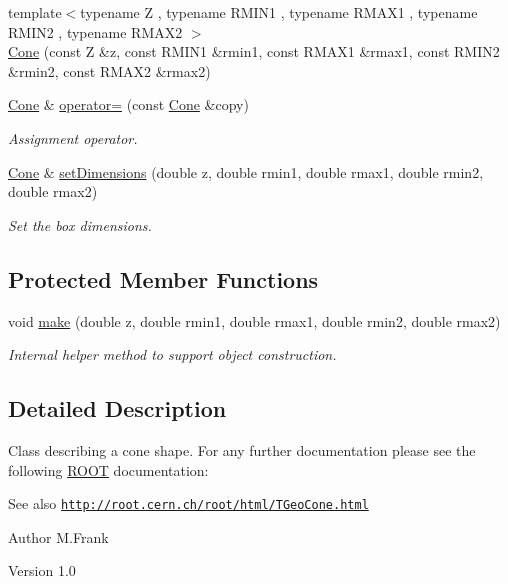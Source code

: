 \begin{DoxyCompactItemize}
{\footnotesize template$<$typename Z , typename RMIN1 , typename RMAX1 , typename RMIN2 , typename RMAX2 $>$ }\\\hyperlink{class_d_d4hep_1_1_geometry_1_1_cone_a6656bd2a3bdcb21a2a1a6bb259812cb3}{Cone} (const Z \&z, const RMIN1 \&rmin1, const RMAX1 \&rmax1, const RMIN2 \&rmin2, const RMAX2 \&rmax2)
\item 
\hyperlink{class_d_d4hep_1_1_geometry_1_1_cone}{Cone} \& \hyperlink{class_d_d4hep_1_1_geometry_1_1_cone_af1c438fd229ac53ca1f0c555b8f76e1f}{operator=} (const \hyperlink{class_d_d4hep_1_1_geometry_1_1_cone}{Cone} \&copy)
\begin{DoxyCompactList}\small\item\em Assignment operator. \item\end{DoxyCompactList}\item 
\hyperlink{class_d_d4hep_1_1_geometry_1_1_cone}{Cone} \& \hyperlink{class_d_d4hep_1_1_geometry_1_1_cone_a946a244f8072fba8aab8d71379bafa46}{setDimensions} (double z, double rmin1, double rmax1, double rmin2, double rmax2)
\begin{DoxyCompactList}\small\item\em Set the box dimensions. \item\end{DoxyCompactList}\end{DoxyCompactItemize}
\subsection*{Protected Member Functions}
\begin{DoxyCompactItemize}
\item 
void \hyperlink{class_d_d4hep_1_1_geometry_1_1_cone_ace6de89d73b615ba28493951b83883a0}{make} (double z, double rmin1, double rmax1, double rmin2, double rmax2)
\begin{DoxyCompactList}\small\item\em Internal helper method to support object construction. \item\end{DoxyCompactList}\end{DoxyCompactItemize}


\subsection{Detailed Description}
Class describing a cone shape. For any further documentation please see the following \hyperlink{namespace_r_o_o_t}{ROOT} documentation: \begin{DoxySeeAlso}{See also}
\href{http://root.cern.ch/root/html/TGeoCone.html}{\tt http://root.cern.ch/root/html/TGeoCone.html}
\end{DoxySeeAlso}
\begin{DoxyAuthor}{Author}
M.Frank 
\end{DoxyAuthor}
\begin{DoxyVersion}{Version}
1.0 
\end{DoxyVersion}


